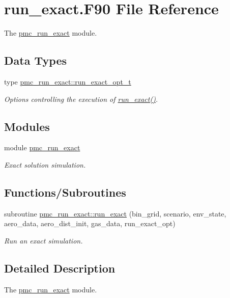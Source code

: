 \hypertarget{run__exact_8_f90}{}\section{run\+\_\+exact.\+F90 File Reference}
\label{run__exact_8_f90}


The \mbox{\hyperlink{namespacepmc__run__exact}{pmc\+\_\+run\+\_\+exact}} module.  


\subsection*{Data Types}
\begin{DoxyCompactItemize}
\item 
type \mbox{\hyperlink{structpmc__run__exact_1_1run__exact__opt__t}{pmc\+\_\+run\+\_\+exact\+::run\+\_\+exact\+\_\+opt\+\_\+t}}
\begin{DoxyCompactList}\small\item\em Options controlling the execution of \mbox{\hyperlink{namespacepmc__run__exact_a8db86b29e1aee6d3aa9f2e922dd1eb97}{run\+\_\+exact()}}. \end{DoxyCompactList}\end{DoxyCompactItemize}
\subsection*{Modules}
\begin{DoxyCompactItemize}
\item 
module \mbox{\hyperlink{namespacepmc__run__exact}{pmc\+\_\+run\+\_\+exact}}
\begin{DoxyCompactList}\small\item\em Exact solution simulation. \end{DoxyCompactList}\end{DoxyCompactItemize}
\subsection*{Functions/\+Subroutines}
\begin{DoxyCompactItemize}
\item 
subroutine \mbox{\hyperlink{namespacepmc__run__exact_a8db86b29e1aee6d3aa9f2e922dd1eb97}{pmc\+\_\+run\+\_\+exact\+::run\+\_\+exact}} (bin\+\_\+grid, scenario, env\+\_\+state, aero\+\_\+data, aero\+\_\+dist\+\_\+init, gas\+\_\+data, run\+\_\+exact\+\_\+opt)
\begin{DoxyCompactList}\small\item\em Run an exact simulation. \end{DoxyCompactList}\end{DoxyCompactItemize}


\subsection{Detailed Description}
The \mbox{\hyperlink{namespacepmc__run__exact}{pmc\+\_\+run\+\_\+exact}} module. 

